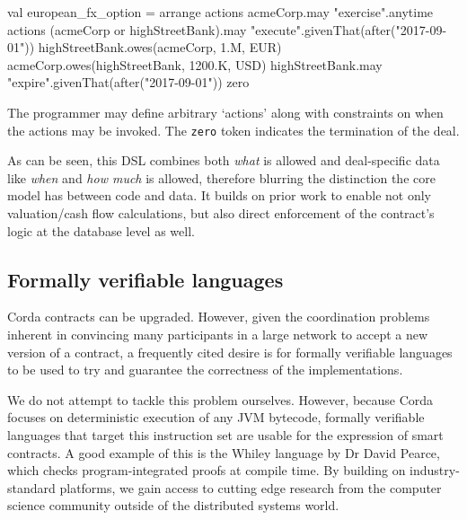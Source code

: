 \documentclass{article}
\begin{document}
\begin{kotlincode}
    val european_fx_option = arrange {
        actions {
            acmeCorp.may {
                "exercise".anytime {
                    actions {
                        (acmeCorp or highStreetBank).may {
                            "execute".givenThat(after("2017-09-01")) {
                                highStreetBank.owes(acmeCorp, 1.M, EUR)
                                acmeCorp.owes(highStreetBank, 1200.K, USD)
                            }
                        }
                    }
                }
            }
            highStreetBank.may {
                "expire".givenThat(after("2017-09-01")) {
                    zero
                }
            }
        }
    }
\end{kotlincode}

The programmer may define arbitrary `actions' along with constraints on when the actions may be invoked. The
\texttt{zero} token indicates the termination of the deal.

As can be seen, this DSL combines both \emph{what} is allowed and deal-specific data like \emph{when} and \emph{how much}
is allowed, therefore blurring the distinction the core model has between code and data. It builds on prior work
to enable not only valuation/cash flow calculations, but also direct enforcement of the contract's logic at the
database level as well.

\subsection{Formally verifiable languages}

Corda contracts can be upgraded. However, given the coordination problems inherent in convincing many participants
in a large network to accept a new version of a contract, a frequently cited desire is for formally verifiable
languages to be used to try and guarantee the correctness of the implementations.

We do not attempt to tackle this problem ourselves. However, because Corda focuses on deterministic execution of
any JVM bytecode, formally verifiable languages that target this instruction set are usable for the expression
of smart contracts. A good example of this is the Whiley language by Dr David Pearce\cite{Pearce2015191}, which
checks program-integrated proofs at compile time. By building on industry-standard platforms, we gain access to
cutting edge research from the computer science community outside of the distributed systems world.
\end{document}
